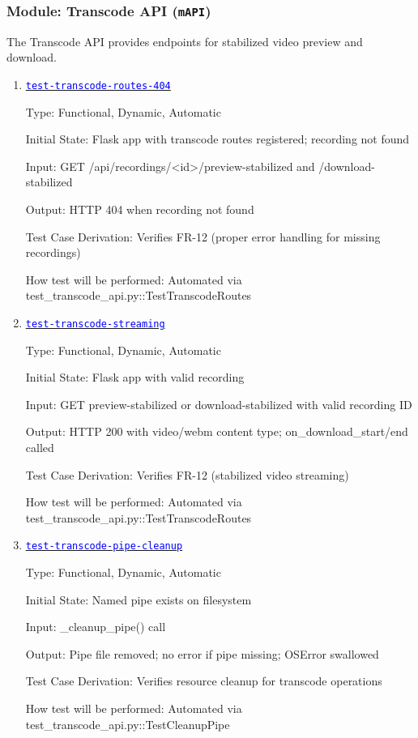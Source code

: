 \documentclass[12pt, titlepage]{article}
\newcommand{\mref}[1]{\texttt{#1}}
\newcommand{\tid}[1]{\hyperlink{tid:#1}{\textcolor{blue}{\texttt{#1}}}}
\begin{document}
\subsubsection{Module: Transcode API (\mref{mAPI})}

The Transcode API provides endpoints for stabilized video preview and download.

\begin{enumerate}

  \item{\tid{test-transcode-routes-404}\\}

        Type: Functional, Dynamic, Automatic

        Initial State: Flask app with transcode routes registered; recording not found

        Input: GET /api/recordings/<id>/preview-stabilized and /download-stabilized

        Output: HTTP 404 when recording not found

        Test Case Derivation: Verifies FR-12 (proper error handling for missing
        recordings)

        How test will be performed: Automated via
        test\_transcode\_api.py::TestTranscodeRoutes

  \item{\tid{test-transcode-streaming}\\}

        Type: Functional, Dynamic, Automatic

        Initial State: Flask app with valid recording

        Input: GET preview-stabilized or download-stabilized with valid recording ID

        Output: HTTP 200 with video/webm content type; on\_download\_start/end called

        Test Case Derivation: Verifies FR-12 (stabilized video streaming)

        How test will be performed: Automated via
        test\_transcode\_api.py::TestTranscodeRoutes

  \item{\tid{test-transcode-pipe-cleanup}\\}

        Type: Functional, Dynamic, Automatic

        Initial State: Named pipe exists on filesystem

        Input: \_cleanup\_pipe() call

        Output: Pipe file removed; no error if pipe missing; OSError swallowed

        Test Case Derivation: Verifies resource cleanup for transcode operations

        How test will be performed: Automated via
        test\_transcode\_api.py::TestCleanupPipe

\end{enumerate}
\end{document}
